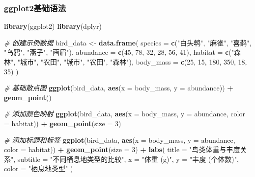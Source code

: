 \documentclass[
]{book}
\newenvironment{Shaded}{\begin{snugshade}}{\end{snugshade}}
\newcommand{\AttributeTok}[1]{\textcolor[rgb]{0.13,0.29,0.53}{#1}}
\newcommand{\CommentTok}[1]{\textcolor[rgb]{0.56,0.35,0.01}{\textit{#1}}}
\newcommand{\DecValTok}[1]{\textcolor[rgb]{0.00,0.00,0.81}{#1}}
\newcommand{\FunctionTok}[1]{\textcolor[rgb]{0.13,0.29,0.53}{\textbf{#1}}}
\newcommand{\NormalTok}[1]{#1}
\newcommand{\OtherTok}[1]{\textcolor[rgb]{0.56,0.35,0.01}{#1}}
\newcommand{\SpecialCharTok}[1]{\textcolor[rgb]{0.81,0.36,0.00}{\textbf{#1}}}
\newcommand{\StringTok}[1]{\textcolor[rgb]{0.31,0.60,0.02}{#1}}
\begin{document}
\hypertarget{ggplot2ux57faux7840ux8bedux6cd5}{%
\subsubsection{ggplot2基础语法}\label{ggplot2ux57faux7840ux8bedux6cd5}}

\begin{Shaded}
\begin{Highlighting}[]
\FunctionTok{library}\NormalTok{(ggplot2)}
\FunctionTok{library}\NormalTok{(dplyr)}

\CommentTok{\# 创建示例数据}
\NormalTok{bird\_data }\OtherTok{\textless{}{-}} \FunctionTok{data.frame}\NormalTok{(}
  \AttributeTok{species =} \FunctionTok{c}\NormalTok{(}\StringTok{"白头鹎"}\NormalTok{, }\StringTok{"麻雀"}\NormalTok{, }\StringTok{"喜鹊"}\NormalTok{, }\StringTok{"乌鸦"}\NormalTok{, }\StringTok{"燕子"}\NormalTok{, }\StringTok{"画眉"}\NormalTok{),}
  \AttributeTok{abundance =} \FunctionTok{c}\NormalTok{(}\DecValTok{45}\NormalTok{, }\DecValTok{78}\NormalTok{, }\DecValTok{32}\NormalTok{, }\DecValTok{28}\NormalTok{, }\DecValTok{56}\NormalTok{, }\DecValTok{41}\NormalTok{),}
  \AttributeTok{habitat =} \FunctionTok{c}\NormalTok{(}\StringTok{"森林"}\NormalTok{, }\StringTok{"城市"}\NormalTok{, }\StringTok{"农田"}\NormalTok{, }\StringTok{"城市"}\NormalTok{, }\StringTok{"农田"}\NormalTok{, }\StringTok{"森林"}\NormalTok{),}
  \AttributeTok{body\_mass =} \FunctionTok{c}\NormalTok{(}\DecValTok{25}\NormalTok{, }\DecValTok{15}\NormalTok{, }\DecValTok{180}\NormalTok{, }\DecValTok{350}\NormalTok{, }\DecValTok{18}\NormalTok{, }\DecValTok{35}\NormalTok{)}
\NormalTok{)}

\CommentTok{\# 基础散点图}
\FunctionTok{ggplot}\NormalTok{(bird\_data, }\FunctionTok{aes}\NormalTok{(}\AttributeTok{x =}\NormalTok{ body\_mass, }\AttributeTok{y =}\NormalTok{ abundance)) }\SpecialCharTok{+}
  \FunctionTok{geom\_point}\NormalTok{()}

\CommentTok{\# 添加颜色映射}
\FunctionTok{ggplot}\NormalTok{(bird\_data, }\FunctionTok{aes}\NormalTok{(}\AttributeTok{x =}\NormalTok{ body\_mass, }\AttributeTok{y =}\NormalTok{ abundance, }\AttributeTok{color =}\NormalTok{ habitat)) }\SpecialCharTok{+}
  \FunctionTok{geom\_point}\NormalTok{(}\AttributeTok{size =} \DecValTok{3}\NormalTok{)}

\CommentTok{\# 添加标题和标签}
\FunctionTok{ggplot}\NormalTok{(bird\_data, }\FunctionTok{aes}\NormalTok{(}\AttributeTok{x =}\NormalTok{ body\_mass, }\AttributeTok{y =}\NormalTok{ abundance, }\AttributeTok{color =}\NormalTok{ habitat)) }\SpecialCharTok{+}
  \FunctionTok{geom\_point}\NormalTok{(}\AttributeTok{size =} \DecValTok{3}\NormalTok{) }\SpecialCharTok{+}
  \FunctionTok{labs}\NormalTok{(}
    \AttributeTok{title =} \StringTok{"鸟类体重与丰度关系"}\NormalTok{,}
    \AttributeTok{subtitle =} \StringTok{"不同栖息地类型的比较"}\NormalTok{,}
    \AttributeTok{x =} \StringTok{"体重 (g)"}\NormalTok{,}
    \AttributeTok{y =} \StringTok{"丰度 (个体数)"}\NormalTok{,}
    \AttributeTok{color =} \StringTok{"栖息地类型"}
\NormalTok{  )}
\end{Highlighting}
\end{Shaded}
\end{document}

